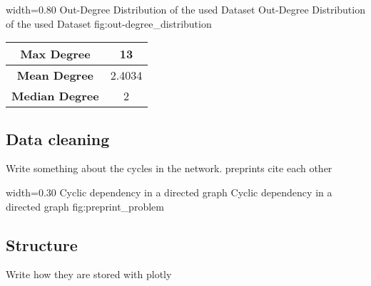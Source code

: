       {width=0.80\textwidth}
      {Out-Degree Distribution of the used Dataset}
      {Out-Degree Distribution of the used Dataset}
      {fig:out-degree_distribution}

    \begin{center}
      \begin{tabular}{ | c | c | }
        \hline
        \textbf{Max Degree} & 13 \\ \hline
        \textbf{Mean Degree} & 2.4034 \\ \hline
        \textbf{Median Degree} & 2 \\ \hline
      \end{tabular}
    \end{center}

\subsection{Data cleaning}
\label{subsec:data_cleaning}
Write something about the cycles in the network. preprints cite each other

      {width=0.30\textwidth}
      {Cyclic dependency in a directed graph}
      {Cyclic dependency in a directed graph}
      {fig:preprint_problem}


\subsection{Structure}
\label{sec:analysis}
Write how they are stored with plotly
